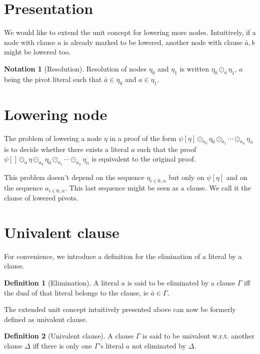 \documentclass[a4paper]{article}
\theoremstyle{definition}
\newtheorem{defn}{Definition}
\newtheorem*{nota}{Notation}
\begin{document}
\section{Presentation}

We would like to extend the unit concept for lowering more nodes. Intuitively,
if a node with clause $a$ is already marked to be lowered, another node with
clause $\bar{a},b$ might be lowered too.

\begin{nota}[Resolution]
Resolution of nodes $\eta_0$ and $\eta_1$ is written $\eta_0 \odot_a
\eta_1$, $a$ being the pivot literal such that $\bar{a} \in \eta_0$ and $a
\in \eta_1$.
\end{nota}

\section{Lowering node}

The problem of lowering a node $\eta$ in a proof of the form $\psi[\eta]
\odot_{a_0} \eta_0 \odot_{a_1} \cdots \odot_{a_n} \eta_n$ is to decide
whether there exists a literal $a$ such that the proof $\psi[] \odot_a \eta
\odot_{a_0} \eta_0 \odot_{a_1} \cdots \odot_{a_n} \eta_n$ is equivalent to
the original proof.

This problem doesn't depend on the sequence $\eta_{i \in 0..n}$ but only on
$\psi[\eta]$ and on the sequence $a_{i \in 0..n}$. This last sequence might
be seen as a clause. We call it the clause of lowered pivots.

\section{Univalent clause}

For convenience, we introduce a definition for the elimination of a literal by a
clause.

\begin{defn}[Elimination]
A literal $a$ is said to be eliminated by a clause $\Gamma$ iff the dual of that
literal belongs to the clause, ie $\bar{a} \in \Gamma$.
\end{defn}

The extended unit concept intuitively presented above can now be formerly
defined as univalent clause.

\begin{defn}[Univalent clause]
A clause $\Gamma$ is said to be univalent w.r.t. another clause $\Delta$ iff
there is only one $\Gamma$'s literal $a$ not eliminated by $\Delta$.
\end{defn}
\end{document}
